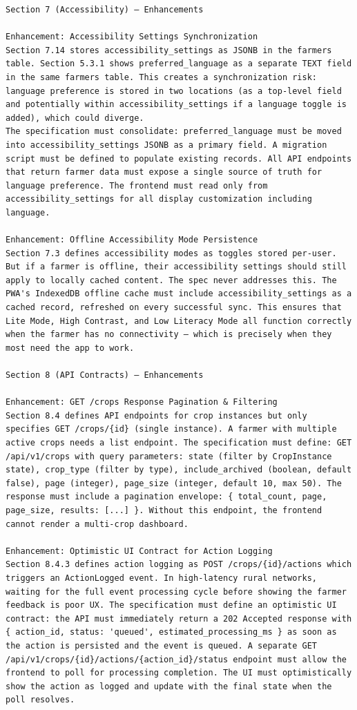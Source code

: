 \documentclass{article}
\begin{document}
\begin{verbatim}
Section 7 (Accessibility) — Enhancements

Enhancement: Accessibility Settings Synchronization
Section 7.14 stores accessibility_settings as JSONB in the farmers table. Section 5.3.1 shows preferred_language as a separate TEXT field in the same farmers table. This creates a synchronization risk: language preference is stored in two locations (as a top-level field and potentially within accessibility_settings if a language toggle is added), which could diverge.
The specification must consolidate: preferred_language must be moved into accessibility_settings JSONB as a primary field. A migration script must be defined to populate existing records. All API endpoints that return farmer data must expose a single source of truth for language preference. The frontend must read only from accessibility_settings for all display customization including language.

Enhancement: Offline Accessibility Mode Persistence
Section 7.3 defines accessibility modes as toggles stored per-user. But if a farmer is offline, their accessibility settings should still apply to locally cached content. The spec never addresses this. The PWA's IndexedDB offline cache must include accessibility_settings as a cached record, refreshed on every successful sync. This ensures that Lite Mode, High Contrast, and Low Literacy Mode all function correctly when the farmer has no connectivity — which is precisely when they most need the app to work.

Section 8 (API Contracts) — Enhancements

Enhancement: GET /crops Response Pagination & Filtering
Section 8.4 defines API endpoints for crop instances but only specifies GET /crops/{id} (single instance). A farmer with multiple active crops needs a list endpoint. The specification must define: GET /api/v1/crops with query parameters: state (filter by CropInstance state), crop_type (filter by type), include_archived (boolean, default false), page (integer), page_size (integer, default 10, max 50). The response must include a pagination envelope: { total_count, page, page_size, results: [...] }. Without this endpoint, the frontend cannot render a multi-crop dashboard.

Enhancement: Optimistic UI Contract for Action Logging
Section 8.4.3 defines action logging as POST /crops/{id}/actions which triggers an ActionLogged event. In high-latency rural networks, waiting for the full event processing cycle before showing the farmer feedback is poor UX. The specification must define an optimistic UI contract: the API must immediately return a 202 Accepted response with { action_id, status: 'queued', estimated_processing_ms } as soon as the action is persisted and the event is queued. A separate GET /api/v1/crops/{id}/actions/{action_id}/status endpoint must allow the frontend to poll for processing completion. The UI must optimistically show the action as logged and update with the final state when the poll resolves.


\end{verbatim}
\end{document}
